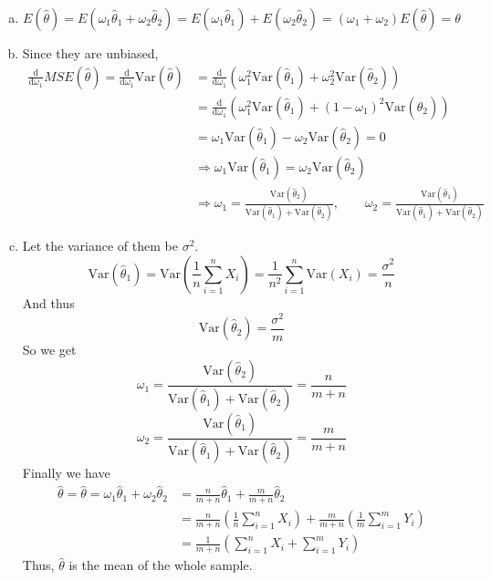 \documentclass[10.5pt]{article}
\begin{document}
\begin{enumerate}[(a)]
	\item $$E(\widehat{\theta}) = E(\omega_1\widehat{\theta}_1+\omega_2\widehat{\theta}_2)=E(\omega_1\widehat{\theta}_1)+E(\omega_2\widehat{\theta}_2)=(\omega_1+\omega_2)E(\widehat{\theta})=\theta$$\vspace{0.4cm}
	\item Since they are unbiased, \begin{align*}
		\frac{\mathrm{d}}{\mathrm{d} \omega_1} MSE(\widehat{\theta}) = \frac{\mathrm{d}}{\mathrm{d} \omega_1}\text{Var}(\widehat{\theta})
		&=\frac{\mathrm{d}}{\mathrm{d} \omega_1}(\omega_1^2\text{Var}(\widehat{\theta}_1)+\omega_2^2\text{Var}(\widehat{\theta}_2))\\[6pt]
		&=\frac{\mathrm{d}}{\mathrm{d} \omega_1}(\omega_1^2\text{Var}(\widehat{\theta}_1)+(1-\omega_1)^2\text{Var}(\widehat{\theta}_2))\\[6pt]
		&=\omega_1\text{Var}(\widehat{\theta}_1)-\omega_2\text{Var}(\widehat{\theta}_2)=0\\[6pt]
		&\Rightarrow \omega_1\text{Var}(\widehat{\theta}_1)=\omega_2\text{Var}(\widehat{\theta}_2)\\[6pt]
		&\Rightarrow \omega_1=\frac{\text{Var}(\widehat{\theta}_2)}{\text{Var}(\widehat{\theta}_1)+\text{Var}(\widehat{\theta}_2)}, \qquad\omega_2=\frac{\text{Var}(\widehat{\theta}_1)}{\text{Var}(\widehat{\theta}_1)+\text{Var}(\widehat{\theta}_2)}
	\end{align*}\vspace{0.4cm}
	\item Let the variance of them be $\sigma^2$.$$\text{Var}(\widehat{\theta}_1)=\text{Var}\left(\frac{1}{n}\sum_{i = 1}^nX_i\right) = \frac{1}{n^2}\sum_{i = 1}^n\text{Var}(X_i)=\frac{\sigma^2}{n}$$
	And thus $$\text{Var}(\widehat{\theta}_2)=\frac{\sigma^2}{m}$$
	So we get$$\omega_1=\frac{\text{Var}(\widehat{\theta}_2)}{\text{Var}(\widehat{\theta}_1)+\text{Var}(\widehat{\theta}_2)}=\frac{n}{m+n}$$
	$$\omega_2=\frac{\text{Var}(\widehat{\theta}_1)}{\text{Var}(\widehat{\theta}_1)+\text{Var}(\widehat{\theta}_2)}=\frac{m}{m+n}$$
	Finally we have\begin{align*}
		\widehat{\theta} = \widehat{\theta} = \omega_1\widehat{\theta}_1+\omega_2\widehat{\theta}_2
		&=\frac{n}{m+n}\widehat{\theta}_1+\frac{m}{m+n}\widehat{\theta}_2\\[6pt]
		&=\frac{n}{m+n}\left(\frac{1}{n}\sum_{i = 1}^nX_i\right)+\frac{m}{m+n}\left(\frac{1}{m}\sum_{i = 1}^mY_i\right)\\[6pt]
		&=\frac{1}{m+n}\left(\sum_{i = 1}^nX_i+\sum_{i = 1}^mY_i\right)
	\end{align*}
	Thus, $\widehat{\theta}$ is the mean of the whole sample.
\end{enumerate}
\end{document}
